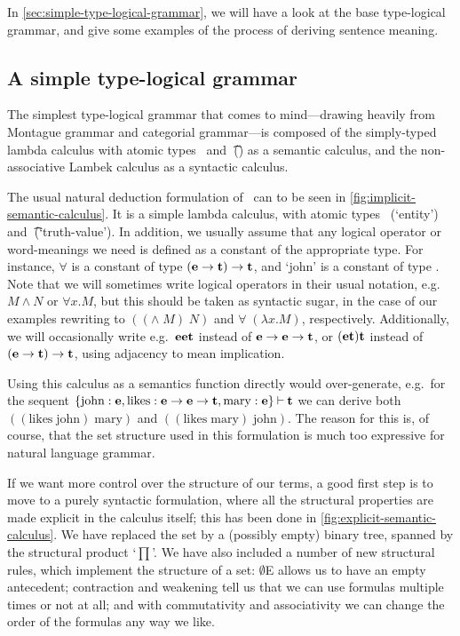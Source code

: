 In \autoref{sec:simple-type-logical-grammar}, we will have a look at
the base type-logical grammar, and give some examples of the process
of deriving sentence meaning.



\subsection{A simple type-logical grammar}
\label{sec:simple-type-logical-grammar}

The simplest type-logical grammar that comes to mind---drawing
heavily from Montague grammar and categorial grammar---is composed of
the simply-typed lambda calculus with atomic types \e\ and \t\ (\lamET) as
a semantic calculus, and the non-associative Lambek calculus
\citep[NL;][]{lambek1961} as a syntactic calculus.

The usual natural deduction formulation of \lamET\ can to be seen in
\autoref{fig:implicit-semantic-calculus}. It is a simple lambda
calculus, with atomic types \e\ (`entity') and \t\ (`truth-value').
In addition, we usually assume that any logical operator or
word-meanings we need is defined as a constant of the appropriate
type. For instance, $\forall$ is a constant of type $(\mathbf{e}\rightarrow\mathbf{t})\rightarrow\mathbf{t}$,
and `john' is a constant of type \e. Note that we will sometimes write
logical operators in their usual notation, e.g.\ $M\wedge N$ or
$\forall x.M$, but this should be taken as syntactic sugar, in the
case of our examples rewriting to $(({\wedge}\;M)\;N)$ and
$\forall\;(\lambda{x}.M)$, respectively. Additionally, we will
occasionally write e.g.\ $\mathbf{e}\mathbf{e}\mathbf{t}$ instead of $\mathbf{e}\rightarrow\mathbf{e}\rightarrow\mathbf{t}$, or
$(\mathbf{e}\mathbf{t})\mathbf{t}$ instead of $(\mathbf{e}\rightarrow\mathbf{t})\rightarrow\mathbf{t}$, using adjacency to mean
implication.

%

Using this calculus as a semantics function directly would
over-generate, e.g.\ for the sequent $\{\text{john}:\mathbf{e},
\text{likes}:\mathbf{e}\rightarrow\mathbf{e}\rightarrow\mathbf{t}, \text{mary}:\mathbf{e}\}\mathbin{\vdash}\mathbf{t}$ we can derive
both $((\text{likes}\;\text{john})\;\text{mary})$ and
$((\text{likes}\;\text{mary})\;\text{john})$.
The reason for this is, of course, that the set structure used in this
formulation is much too expressive for natural language grammar.

If we want more control over the structure of our terms, a good first
step is to move to a purely syntactic formulation, where all the
structural properties are made explicit in the calculus itself; this
has been done in \autoref{fig:explicit-semantic-calculus}. We have
replaced the set by a (possibly empty) binary tree, spanned by the
structural product `$\prod$'. We have also included a number of new
structural rules, which implement the structure of a set: $\emptyset$E
allows us to have an empty antecedent; contraction and weakening tell
us that we can use formulas multiple times or not at all; and with
commutativity and associativity we can change the order of the
formulas any way we like.

